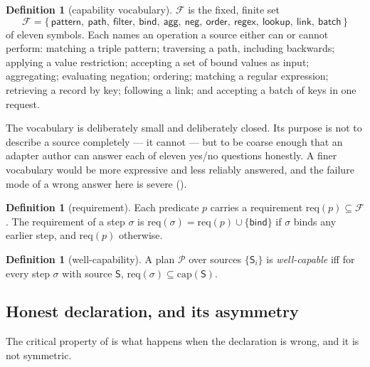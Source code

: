 \documentclass[11pt,a4paper]{article}
\theoremstyle{plain}
\theoremstyle{definition}
\newtheorem{definition}[theorem]{Definition}
\theoremstyle{remark}
\newcommand{\Plan}{\mathcal{P}}
\newcommand{\Step}{\sigma}
\newcommand{\Src}{\mathsf{S}}
\newcommand{\Capset}{\mathrm{cap}}
\newcommand{\Req}{\mathrm{req}}
\newcommand{\Feat}{\mathcal{F}}
\begin{document}
\begin{definition}[capability vocabulary]
\label{def:feat}
$\Feat$ is the fixed, finite set
\[
\Feat = \{\,\textsf{pattern},\ \textsf{path},\ \textsf{filter},\
\textsf{bind},\ \textsf{agg},\ \textsf{neg},\ \textsf{order},\
\textsf{regex},\ \textsf{lookup},\ \textsf{link},\ \textsf{batch}\,\}
\]
of eleven symbols. Each names an operation a source either can or cannot
perform: matching a triple pattern; traversing a path, including
backwards; applying a value restriction; accepting a set of bound values
as input; aggregating; evaluating negation; ordering; matching a regular
expression; retrieving a record by key; following a link; and accepting
a batch of keys in one request.
\end{definition}

The vocabulary is deliberately small and deliberately closed. Its
purpose is not to describe a source completely --- it cannot --- but to
be coarse enough that an adapter author can answer each of eleven
yes/no questions honestly. A finer vocabulary would be more expressive
and less reliably answered, and the failure mode of a wrong answer here
is severe (\Cref{sec:honesty}).

\begin{definition}[requirement]
\label{def:req}
Each predicate $p$ carries a requirement $\Req(p) \subseteq \Feat$. The
requirement of a step $\Step$ is $\Req(\Step) = \Req(p) \cup
\{\textsf{bind}\}$ if $\Step$ binds any earlier step, and $\Req(p)$
otherwise.
\end{definition}

\begin{definition}[well-capability]
\label{def:wellcap}
A plan $\Plan$ over sources $\{\Src_i\}$ is \emph{well-capable} iff for
every step $\Step$ with source $\Src$,
$\Req(\Step) \subseteq \Capset(\Src)$.
\end{definition}

\subsection{Honest declaration, and its asymmetry}
\label{sec:honesty}

The critical property of  is what happens when the
declaration is wrong, and it is not symmetric.
\end{document}
